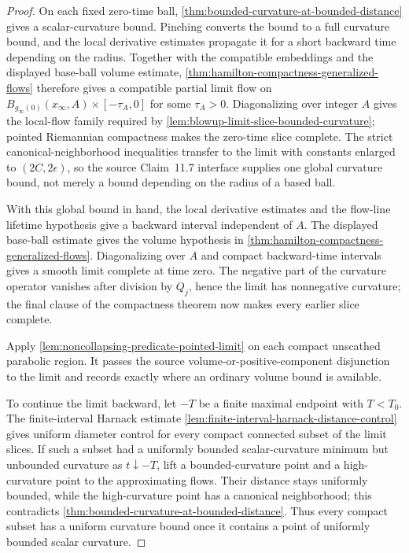 \begin{proof}
On each fixed zero-time ball,
\ref{thm:bounded-curvature-at-bounded-distance} gives a scalar-curvature
bound.  Pinching converts the bound to a full curvature bound, and the
local derivative estimates propagate it for a short backward time depending
on the radius.  Together with the compatible embeddings and the displayed
base-ball volume estimate, \ref{thm:hamilton-compactness-generalized-flows}
therefore gives a compatible partial limit flow on
$B_{g_\infty(0)}(x_\infty,A)\times[-\tau_A,0]$ for some $\tau_A>0$.
Diagonalizing over integer $A$ gives the local-flow family required by
\ref{lem:blowup-limit-slice-bounded-curvature}; pointed Riemannian
compactness makes the zero-time slice complete.  The strict
canonical-neighborhood inequalities transfer to the limit with constants
enlarged to $(2C,2\epsilon)$, so the source Claim~11.7 interface supplies one
global curvature bound, not merely a bound depending on the radius of a based
ball.

With this global bound in hand, the local derivative estimates and the
flow-line lifetime hypothesis give a backward interval independent of $A$.
The displayed base-ball estimate gives the volume hypothesis in
\ref{thm:hamilton-compactness-generalized-flows}.  Diagonalizing over $A$
and compact backward-time intervals gives a smooth limit complete at time
zero.
The negative part of the curvature operator vanishes after division by
$Q_j$, hence the limit has nonnegative curvature; the final clause of the
compactness theorem now makes every earlier slice complete.

Apply \ref{lem:noncollapsing-predicate-pointed-limit} on each compact
unscathed parabolic region.  It passes the source volume-or-positive-component
disjunction to the limit and records exactly where an ordinary volume bound is
available.

To continue the limit backward, let $-T$ be a finite maximal endpoint with
$T<T_0$.  The finite-interval Harnack estimate
\ref{lem:finite-interval-harnack-distance-control} gives uniform diameter
control for every compact connected subset of the limit slices.  If such a
subset had a uniformly bounded scalar-curvature minimum but unbounded
curvature as $t\downarrow-T$, lift a bounded-curvature point and a
high-curvature point to the approximating flows.  Their distance stays
uniformly bounded, while the high-curvature point has a canonical
neighborhood; this contradicts
\ref{thm:bounded-curvature-at-bounded-distance}.  Thus every compact
subset has a uniform curvature bound once it contains a point of uniformly
bounded scalar curvature.


\end{proof}
